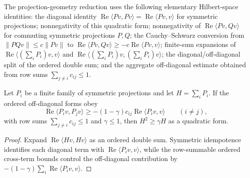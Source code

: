 \begin{remark}
    \label{rem:projection_geometry_rowsum_identities}
    \leanok
    The projection-geometry reduction uses the following elementary Hilbert-space
    identities: the diagonal identity
    $\operatorname{Re}\langle Pv,Pv\rangle=\operatorname{Re}\langle Pv,v\rangle$
    for symmetric projections; nonnegativity of this quadratic form; nonnegativity
    of $\operatorname{Re}\langle Pv,Qv\rangle$ for commuting symmetric projections
    $P,Q$; the Cauchy--Schwarz conversion from
    $\|P Q v\|\le c\|Pv\|$ to
    $\operatorname{Re}\langle Pv,Qv\rangle\ge -c\operatorname{Re}\langle Pv,v\rangle$;
    finite-sum expansions of
    $\operatorname{Re}\langle (\sum_i P_i)v,v\rangle$ and
    $\operatorname{Re}\langle (\sum_i P_i)v,(\sum_i P_i)v\rangle$; the
    diagonal/off-diagonal split of the ordered double sum; and the aggregate
    off-diagonal estimate obtained from row sums $\sum_{j\ne i}c_{ij}\le1$.
\end{remark}

\begin{lemma}
    \label{lem:ordered_projection_rowsum_reduction}
    \leanok
    Let $P_i$ be a finite family of symmetric projections and let
    $H=\sum_i P_i$. If the ordered off-diagonal forms obey
    \[
        \operatorname{Re}\langle P_i v, P_j v\rangle
        \ge -(1-\gamma)c_{ij}\operatorname{Re}\langle P_i v,v\rangle
        \qquad (i\ne j),
    \]
    with row sums $\sum_{j\ne i} c_{ij}\le 1$ and $\gamma\le 1$, then
    $H^2\ge \gamma H$ as a quadratic form.
\end{lemma}

\begin{proof}
    \leanok
    Expand $\operatorname{Re}\langle H v,Hv\rangle$ as an ordered double sum.
    Symmetric idempotence identifies each diagonal term with
    $\operatorname{Re}\langle P_i v,v\rangle$, while the row-summable ordered
    cross-term bounds control the off-diagonal contribution by
    $-(1-\gamma)\sum_i\operatorname{Re}\langle P_i v,v\rangle$.
\end{proof}

